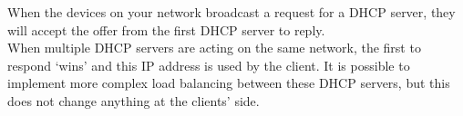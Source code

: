 When the devices on your network broadcast a request for a DHCP server, they will accept the offer from the first DHCP server to reply.\\
When multiple DHCP servers are acting on the same network, the first to respond `wins' and this IP address is used by the client. It is possible to implement more complex load balancing between these DHCP servers, but this does not change anything at the clients' side.
